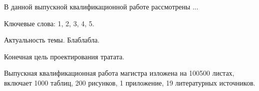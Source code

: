 
В данной выпускной квалификационной работе рассмотрены ...

Ключевые слова: 1, 2, 3, 4, 5.

Актуальность темы. Блаблабла.

Конечная цель проектирования тратата.

Выпускная квалификационная работа магистра изложена на 100500 листах, включает 1000 таблиц, 200 рисунков, 1 приложение, 19 литературных источников.

\clearpage
